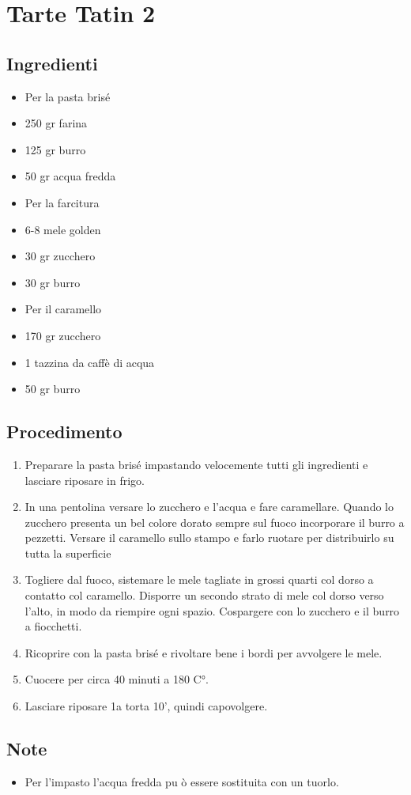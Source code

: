 \section{Tarte Tatin 2}
\subsection{Ingredienti}
\begin{itemize}
\item Per la pasta brisé  
\item 250 gr farina  
\item 125 gr burro  
\item 50 gr acqua fredda  
\item Per la farcitura  
\item 6-8 mele golden  
\item 30 gr zucchero  
\item 30 gr burro  
\item Per il caramello  
\item 170 gr zucchero  
\item 1 tazzina da caffè di acqua  
\item 50 gr burro
\end{itemize}
\subsection{Procedimento}
\begin{enumerate}
\item  Preparare la pasta brisé impastando velocemente tutti gli ingredienti e lasciare riposare in frigo.  
\item  In una pentolina versare lo zucchero e l'acqua e fare caramellare. Quando lo zucchero presenta un bel colore dorato sempre sul fuoco incorporare il burro a pezzetti. Versare il caramello sullo stampo e farlo ruotare per distribuirlo su tutta la superficie  
\item  Togliere dal fuoco, sistemare le mele tagliate in grossi quarti col dorso a contatto col caramello. Disporre un secondo strato di mele col dorso verso l'alto, in modo da riempire ogni spazio. Cospargere con lo zucchero e il burro a fiocchetti.  
\item  Ricoprire con la pasta brisé e rivoltare bene i bordi per avvolgere le mele.  
\item  Cuocere per circa 40 minuti a 180 C°.   
\item  Lasciare riposare 1a torta 10', quindi capovolgere. 
\end{enumerate}
\subsection{Note}
\begin{itemize}
\item Per l'impasto l'acqua fredda pu ò essere sostituita con un tuorlo.
\end{itemize}

